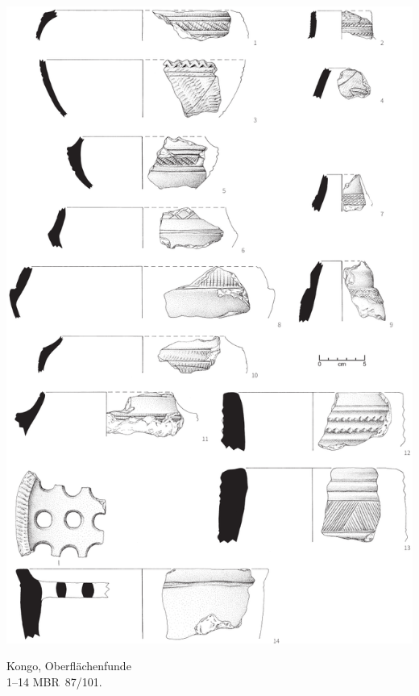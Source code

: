 \begin{pl}[H]
	\includegraphics{plt/Taf31.pdf}
	\vspace{.75em}\caption{Kongo, Oberflächenfunde \\ 1--14 MBR~87/101.}
	\label{pl:31}
\end{pl}

